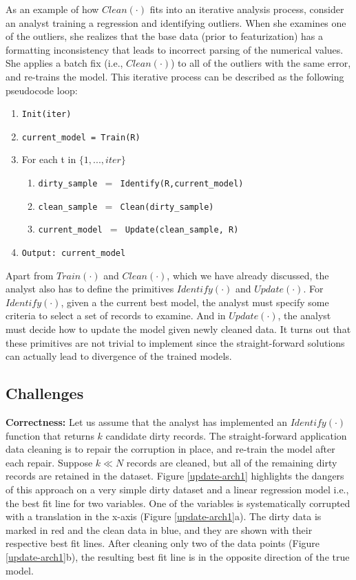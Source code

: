 As an example of how $Clean(\cdot)$ fits into an iterative analysis process, consider an analyst training a regression and identifying outliers. 
When she examines one of the outliers, she realizes that the base data (prior to featurization) has a formatting inconsistency that leads to incorrect parsing of the numerical values.
She applies a batch fix (i.e., $Clean(\cdot)$) to all of the outliers with the same error, and re-trains the model. 
This iterative process can be described as the following pseudocode loop:
\begin{enumerate}[leftmargin=1em]\scriptsize\sloppy
  \item \texttt{Init(iter)}
  \item \texttt{current\_model = Train(R)}
  \item For each t in $\{1,...,iter\}$
  \begin{enumerate}
    \item \texttt{dirty\_sample $=$ Identify(R,current\_model)}
    \item \texttt{clean\_sample $=$ Clean(dirty\_sample)}
    \item \texttt{current\_model $=$ Update(clean\_sample, R)}
  \end{enumerate}
  \item \texttt{Output: current\_model}
  \end{enumerate}

\vspace{0.5em}

Apart from $Train(\cdot)$ and $Clean(\cdot)$, which we have already discussed, the analyst also has to define the primitives $Identify(\cdot)$ and $Update(\cdot)$.
For $Identify(\cdot)$, given a the current best model, the analyst must specify some criteria to select a set of records to examine.
And in $Update(\cdot)$, the analyst must decide how to update the model given newly cleaned data.
It turns out that these primitives are not trivial to implement since the straight-forward solutions can actually lead to divergence of the trained models.

\subsection{Challenges}\label{correctness} 
\vspace{0.5em} 
\textbf{Correctness: } Let us assume that the analyst has implemented an $Identify(\cdot)$ function that returns $k$ candidate dirty records.
The straight-forward application data cleaning is to repair the corruption in place, and re-train the model after each repair.
Suppose $k \ll N$ records are cleaned, but all of the remaining dirty records are retained in the dataset.
Figure \ref{update-arch1} highlights the dangers of this approach on a very simple dirty dataset and a linear regression model i.e., the best fit line for two variables. 
One of the variables is systematically corrupted with a translation in the x-axis (Figure \ref{update-arch1}a).
The dirty data is marked in red and the clean data in blue, and they are shown with their respective best fit lines.
After cleaning only two of the data points (Figure \ref{update-arch1}b), the resulting best fit line is in the opposite direction of the true model.

